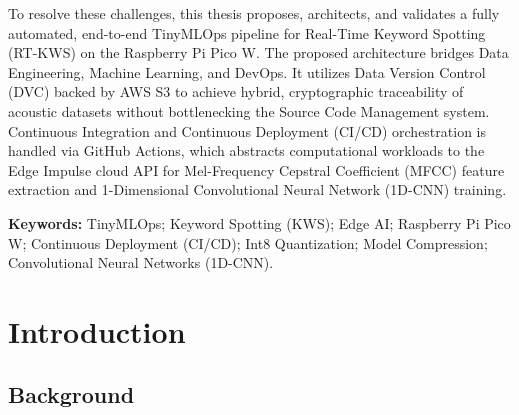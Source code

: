 \documentclass[11pt,a4paper,openany]{book}
\begin{document}
To resolve these challenges, this thesis proposes, architects, and validates a fully automated, end-to-end TinyMLOps pipeline for Real-Time Keyword Spotting (RT-KWS) on the Raspberry Pi Pico W. The proposed architecture bridges Data Engineering, Machine Learning, and DevOps. It utilizes Data Version Control (DVC) backed by AWS S3 to achieve hybrid, cryptographic traceability of acoustic datasets without bottlenecking the Source Code Management system. Continuous Integration and Continuous Deployment (CI/CD) orchestration is handled via GitHub Actions, which abstracts computational workloads to the Edge Impulse cloud API for Mel-Frequency Cepstral Coefficient (MFCC) feature extraction and 1-Dimensional Convolutional Neural Network (1D-CNN) training.

\vspace{15pt}
\noindent
\textbf{Keywords:} TinyMLOps; Keyword Spotting (KWS); Edge AI; Raspberry Pi Pico W; Continuous Deployment (CI/CD); Int8 Quantization; Model Compression; Convolutional Neural Networks (1D-CNN).

\clearpage

\makeatletter
\def\@makeschapterhead#1{%
  \vspace*{50\p@}%
  {\parindent \z@ \raggedright
    \normalfont
    \interlinepenalty\@M
    \Huge \bfseries  #1\par\nobreak
    \vskip 40\p@
  }}
\makeatother

\tableofcontents{}

\listoffigures
{}

\clearpage

\listoftables
{}

\clearpage
{}
\chapter{Introduction}

\section{Background}
\end{document}
